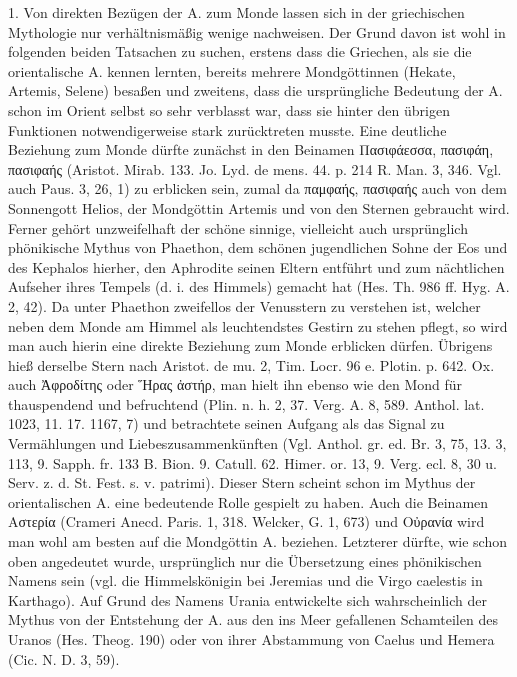 \documentclass[a4paper, 11pt, oneside]{article}
\begin{document}
1. Von direkten Bezügen der A. zum Monde lassen sich in der griechischen Mythologie nur verhältnismäßig wenige nachweisen. Der Grund davon ist wohl in folgenden beiden Tatsachen zu suchen, erstens dass die Griechen, als sie die orientalische A. kennen lernten, bereits mehrere Mondgöttinnen (Hekate, Artemis, Selene) besaßen und zweitens, dass die ursprüngliche Bedeutung der A. schon im Orient selbst so sehr verblasst war, dass sie hinter den übrigen Funktionen notwendigerweise stark zurücktreten musste. Eine deutliche Beziehung zum Monde dürfte zunächst in den Beinamen Πασιφάεσσα, πασιφάη, πασιφαής (Aristot. Mirab. 133. Jo. Lyd. de mens. 44. p. 214 R. Man. 3, 346. Vgl. auch Paus. 3, 26, 1) zu erblicken sein, zumal da παμφαής, πασιφαής auch von dem Sonnengott Helios, der Mondgöttin Artemis und von den Sternen gebraucht wird. Ferner gehört unzweifelhaft der schöne sinnige, vielleicht auch ursprünglich phönikische Mythus von Phaethon, dem schönen jugendlichen Sohne der Eos und des Kephalos hierher, den Aphrodite seinen Eltern entführt und zum nächtlichen Aufseher ihres Tempels (d. i. des Himmels) gemacht hat (Hes. Th. 986 ff. Hyg. A. 2, 42). Da unter Phaethon zweifellos der Venusstern zu verstehen ist, welcher neben dem Monde am Himmel als leuchtendstes Gestirn zu stehen pflegt, so wird man auch hierin eine direkte Beziehung zum Monde erblicken dürfen. Übrigens hieß derselbe Stern nach Aristot. de mu. 2, Tim. Locr. 96 e. Plotin. p. 642. Ox. auch Ἀφροδίτης oder Ἥρας ἀστήρ, man hielt ihn ebenso wie den Mond für thauspendend und befruchtend (Plin. n. h. 2, 37. Verg. A. 8, 589. Anthol. lat. 1023, 11. 17. 1167, 7) und betrachtete seinen Aufgang als das Signal zu Vermählungen und Liebeszusammenkünften (Vgl. Anthol. gr. ed. Br. 3, 75, 13. 3, 113, 9. Sapph. fr. 133 B. Bion. 9. Catull. 62. Himer. or. 13, 9. Verg. ecl. 8, 30 u. Serv. z. d. St. Fest. s. v. patrimi). Dieser Stern scheint schon im Mythus der orientalischen A. eine bedeutende Rolle gespielt zu haben. Auch die Beinamen Αστερία (Crameri Anecd. Paris. 1, 318. Welcker, G. 1, 673) und Οὐρανία wird man wohl am besten auf die Mondgöttin A. beziehen. Letzterer dürfte, wie schon oben angedeutet wurde, ursprünglich nur die Übersetzung eines phönikischen Namens sein (vgl. die Himmelskönigin bei Jeremias und die Virgo caelestis in Karthago). Auf Grund des Namens Urania entwickelte sich wahrscheinlich der Mythus von der Entstehung der A. aus den ins Meer gefallenen Schamteilen des Uranos (Hes. Theog. 190) oder von ihrer Abstammung von Caelus und Hemera (Cic. N. D. 3, 59).
\end{document}
